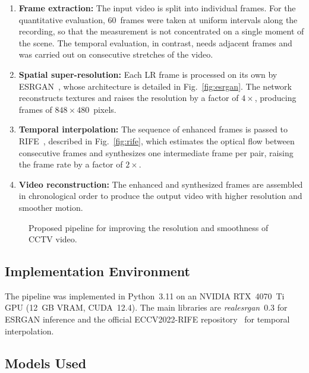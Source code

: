 \documentclass[conference]{IEEEtran}
\begin{document}
\begin{enumerate}
    \item \textbf{Frame extraction:} The input video is split into individual frames. For the quantitative evaluation, 60~frames were taken at uniform intervals along the recording, so that the measurement is not concentrated on a single moment of the scene. The temporal evaluation, in contrast, needs adjacent frames and was carried out on consecutive stretches of the video.

    \item \textbf{Spatial super-resolution:} Each LR frame is processed on its own by ESRGAN~\cite{wang2018esrgan}, whose architecture is detailed in Fig.~\ref{fig:esrgan}. The network reconstructs textures and raises the resolution by a factor of $4\times$, producing frames of $848\times480$~pixels.

    \item \textbf{Temporal interpolation:} The sequence of enhanced frames is passed to RIFE~\cite{huang2022rife}, described in Fig.~\ref{fig:rife}, which estimates the optical flow between consecutive frames and synthesizes one intermediate frame per pair, raising the frame rate by a factor of $2\times$.

    \item \textbf{Video reconstruction:} The enhanced and synthesized frames are assembled in chronological order to produce the output video with higher resolution and smoother motion.
\end{enumerate}

\begin{figure}[t]
    \centering
    
    \caption{Proposed pipeline for improving the resolution and smoothness of CCTV video.}
    \label{fig:pipeline}
\end{figure}

\subsection{Implementation Environment}

The pipeline was implemented in Python~3.11 on an NVIDIA RTX~4070~Ti GPU (12~GB VRAM, CUDA~12.4). The main libraries are \textit{realesrgan}~0.3 for ESRGAN inference and the official ECCV2022-RIFE repository~\cite{huang2022rife} for temporal interpolation.

\subsection{Models Used}
\end{document}
